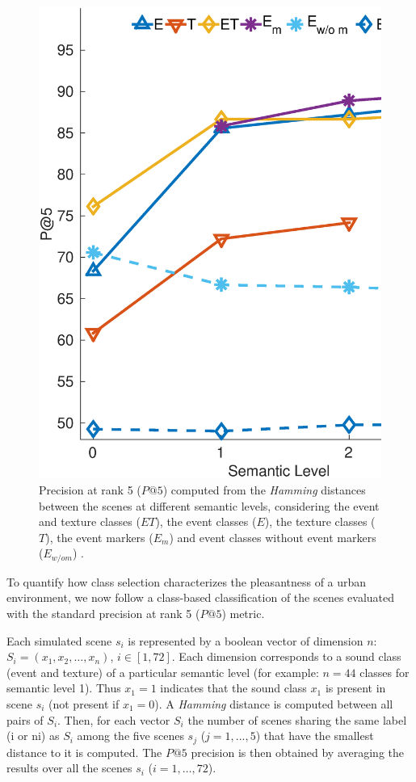\documentclass[twoside,twocolumn]{article}
\begin{document}
\begin{figure}[t]
\begin{center}
\includegraphics[width=\columnwidth]{../gfxMatlab/pa5_1.eps}
\caption{\label{fig:pa5} Precision at rank 5 ($P@5$) computed from the \textit{Hamming} distances between the scenes at different semantic levels, considering the event and texture classes ($ET$), the event classes ($E$), the texture classes ($T$), the event markers ($E_m$) and event classes without event markers ($E_{w/o m}$) .}
\end{center}
\end{figure}

To quantify how class selection characterizes the pleasantness of a urban environment, we now follow a class-based classification of the scenes evaluated with the standard precision at rank 5 ($P@5$) metric. 

Each simulated scene $s_i$ is represented by a boolean vector of dimension $n$: $S_i = (x_1, x_2, \ldots{}, x_{n})$, $i\in[1,72]$. Each dimension corresponds to a sound class (event and texture) of a particular semantic level (for example: $n=44$ classes for semantic level 1). Thus $x_1 = 1$ indicates that the sound class $x_1$ is present in scene $s_i$ (not present if $x_1=0$). A \textit{Hamming} distance is computed between all pairs of $S_i$. Then, for each vector $S_i$ the number of scenes sharing the same label (i or ni) as $S_i$  among the five scenes $s_j$ ($j=1,...,5$) that have the smallest distance to it is computed. The $P@5$ precision is then obtained by averaging the results over all the scenes $s_i$ ($i=1, \ldots{}, 72$).
\end{document}
